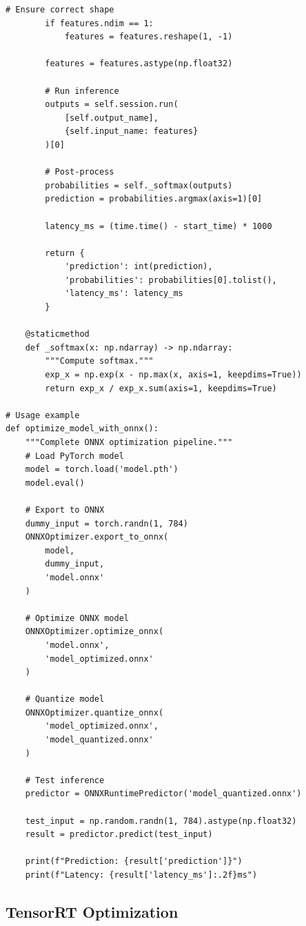 \begin{lstlisting}[style=python, caption=Convert PyTorch model to ONNX]
        # Ensure correct shape
        if features.ndim == 1:
            features = features.reshape(1, -1)

        features = features.astype(np.float32)

        # Run inference
        outputs = self.session.run(
            [self.output_name],
            {self.input_name: features}
        )[0]

        # Post-process
        probabilities = self._softmax(outputs)
        prediction = probabilities.argmax(axis=1)[0]

        latency_ms = (time.time() - start_time) * 1000

        return {
            'prediction': int(prediction),
            'probabilities': probabilities[0].tolist(),
            'latency_ms': latency_ms
        }

    @staticmethod
    def _softmax(x: np.ndarray) -> np.ndarray:
        """Compute softmax."""
        exp_x = np.exp(x - np.max(x, axis=1, keepdims=True))
        return exp_x / exp_x.sum(axis=1, keepdims=True)

# Usage example
def optimize_model_with_onnx():
    """Complete ONNX optimization pipeline."""
    # Load PyTorch model
    model = torch.load('model.pth')
    model.eval()

    # Export to ONNX
    dummy_input = torch.randn(1, 784)
    ONNXOptimizer.export_to_onnx(
        model,
        dummy_input,
        'model.onnx'
    )

    # Optimize ONNX model
    ONNXOptimizer.optimize_onnx(
        'model.onnx',
        'model_optimized.onnx'
    )

    # Quantize model
    ONNXOptimizer.quantize_onnx(
        'model_optimized.onnx',
        'model_quantized.onnx'
    )

    # Test inference
    predictor = ONNXRuntimePredictor('model_quantized.onnx')

    test_input = np.random.randn(1, 784).astype(np.float32)
    result = predictor.predict(test_input)

    print(f"Prediction: {result['prediction']}")
    print(f"Latency: {result['latency_ms']:.2f}ms")
\end{lstlisting}

\subsection{TensorRT Optimization}

